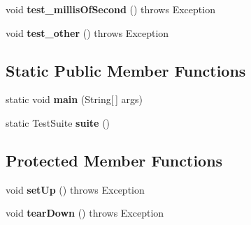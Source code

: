 \begin{DoxyCompactItemize}
\item 
\hypertarget{classorg_1_1joda_1_1time_1_1_test_date_time_field_type_a14b67fcd7a23ebc0dc28b278b44b24ad}{void {\bfseries test\-\_\-millis\-Of\-Second} ()  throws Exception }\label{classorg_1_1joda_1_1time_1_1_test_date_time_field_type_a14b67fcd7a23ebc0dc28b278b44b24ad}

\item 
\hypertarget{classorg_1_1joda_1_1time_1_1_test_date_time_field_type_aa53cb0463457b668d483d0707dae8f5c}{void {\bfseries test\-\_\-other} ()  throws Exception }\label{classorg_1_1joda_1_1time_1_1_test_date_time_field_type_aa53cb0463457b668d483d0707dae8f5c}

\end{DoxyCompactItemize}
\subsection*{Static Public Member Functions}
\begin{DoxyCompactItemize}
\item 
\hypertarget{classorg_1_1joda_1_1time_1_1_test_date_time_field_type_a6f029c6e4e5d77f949402e6e52c964ed}{static void {\bfseries main} (String\mbox{[}$\,$\mbox{]} args)}\label{classorg_1_1joda_1_1time_1_1_test_date_time_field_type_a6f029c6e4e5d77f949402e6e52c964ed}

\item 
\hypertarget{classorg_1_1joda_1_1time_1_1_test_date_time_field_type_aadda0602c7d5cf7996369c91bf6fe6fc}{static Test\-Suite {\bfseries suite} ()}\label{classorg_1_1joda_1_1time_1_1_test_date_time_field_type_aadda0602c7d5cf7996369c91bf6fe6fc}

\end{DoxyCompactItemize}
\subsection*{Protected Member Functions}
\begin{DoxyCompactItemize}
\item 
\hypertarget{classorg_1_1joda_1_1time_1_1_test_date_time_field_type_ae17919a87eca8e8a39e75f7b4ad25a35}{void {\bfseries set\-Up} ()  throws Exception }\label{classorg_1_1joda_1_1time_1_1_test_date_time_field_type_ae17919a87eca8e8a39e75f7b4ad25a35}

\item 
\hypertarget{classorg_1_1joda_1_1time_1_1_test_date_time_field_type_a929c6d5a5372f274b715820575b46d06}{void {\bfseries tear\-Down} ()  throws Exception }\label{classorg_1_1joda_1_1time_1_1_test_date_time_field_type_a929c6d5a5372f274b715820575b46d06}

\end{DoxyCompactItemize}


